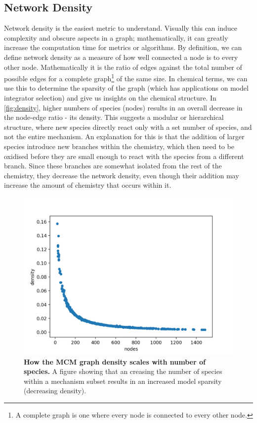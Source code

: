 \subsection{Network Density}\label{sec:netdensity}
Network density is the easiest metric to understand. Visually this can induce complexity and obscure aspects in a graph; mathematically, it can greatly increase the computation time for metrics or algorithms. By definition, we can define network density as a measure of how well connected a node is to every other node. Mathematically it is the ratio of edges against the total number of possible edges for a complete graph\footnote{A complete graph is one where every node is connected to every other node.} of the same size. In chemical terms, we can use this to determine the sparsity of the graph (which has applications on model integrator selection) and give us insights on the chemical structure.  In \autoref{fig:density}, higher numbers of species (nodes) results in an overall decrease in the node-edge ratio - its density. This suggests a modular or hierarchical structure, where new species directly react only with a set number of species, and not the entire mechanism. An explanation for this is that the addition of larger species introduce new branches within the chemistry, which then need to be oxidised before they are small enough to react with the species from a different branch.  Since these branches are somewhat isolated from the rest of the chemistry, they decrease the network density, even though their addition may increase the amount of chemistry that occurs within it.

\begin{figure}[H]
     \centering
         \includegraphics[width=.7\textwidth]{figures_c3/sparcity.png}
        \caption{\textbf{How the MCM graph density scales with number of species.} A figure showing that an creasing the number of species within a mechanism subset results in an increased model sparsity (decreasing density).}
        \label{fig:density}
\end{figure}




